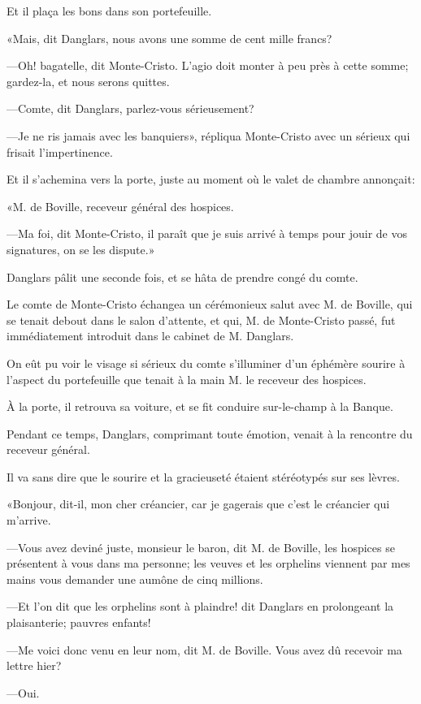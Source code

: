 Et il plaça les bons dans son portefeuille. 

«Mais, dit Danglars, nous avons une somme de cent mille francs? 

—Oh! bagatelle, dit Monte-Cristo. L'agio doit monter à peu près à cette somme; gardez-la, et nous serons quittes. 

—Comte, dit Danglars, parlez-vous sérieusement? 

—Je ne ris jamais avec les banquiers», répliqua Monte-Cristo avec un sérieux qui frisait l'impertinence. 

Et il s'achemina vers la porte, juste au moment où le valet de chambre annonçait: 

«M. de Boville, receveur général des hospices. 

—Ma foi, dit Monte-Cristo, il paraît que je suis arrivé à temps pour jouir de vos signatures, on se les dispute.» 

Danglars pâlit une seconde fois, et se hâta de prendre congé du comte. 

Le comte de Monte-Cristo échangea un cérémonieux salut avec M. de Boville, qui se tenait debout dans le salon d'attente, et qui, M. de Monte-Cristo passé, fut immédiatement introduit dans le cabinet de M. Danglars. 

On eût pu voir le visage si sérieux du comte s'illuminer d'un éphémère sourire à l'aspect du portefeuille que tenait à la main M. le receveur des hospices. 

À la porte, il retrouva sa voiture, et se fit conduire sur-le-champ à la Banque. 

Pendant ce temps, Danglars, comprimant toute émotion, venait à la rencontre du receveur général. 

Il va sans dire que le sourire et la gracieuseté étaient stéréotypés sur ses lèvres. 

«Bonjour, dit-il, mon cher créancier, car je gagerais que c'est le créancier qui m'arrive. 

—Vous avez deviné juste, monsieur le baron, dit M. de Boville, les hospices se présentent à vous dans ma personne; les veuves et les orphelins viennent par mes mains vous demander une aumône de cinq millions. 

—Et l'on dit que les orphelins sont à plaindre! dit Danglars en prolongeant la plaisanterie; pauvres enfants! 

—Me voici donc venu en leur nom, dit M. de Boville. Vous avez dû recevoir ma lettre hier? 

—Oui. 

